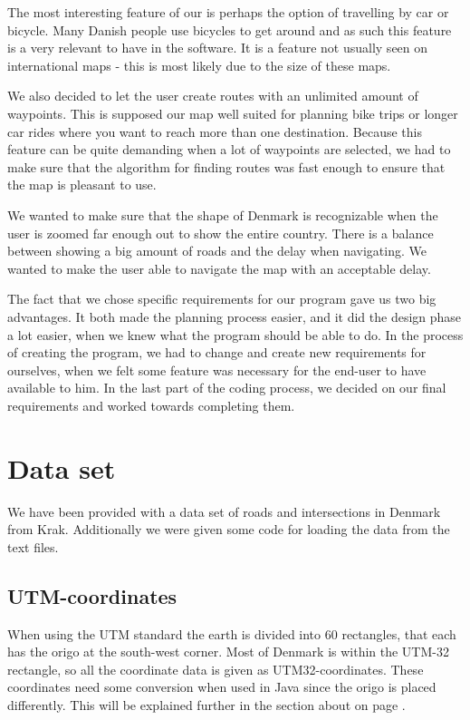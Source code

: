 The most interesting feature of our  is perhaps the
option of travelling by car or bicycle. Many Danish
people use bicycles to get around and as such this feature is a very relevant
to have in the software. It is a feature not usually seen on
international maps - this is most likely due to the size of these maps.

We also decided to let the user create routes with an unlimited amount of
waypoints. This is supposed our map well suited for planning bike trips or
longer car rides where you want to reach more than one destination. Because this
feature can be quite demanding when a lot of waypoints are selected, we had to
make sure that the algorithm for finding routes was fast enough to ensure that the 
map is pleasant to use.

We wanted to make sure that the shape of Denmark is recognizable when
the user is zoomed far enough out to show the entire country. There is a balance between
showing a big amount of roads and the delay when navigating. We wanted to make
the user able to navigate the map with an acceptable delay. 

The fact that we chose specific requirements for our program gave us two big
advantages. It both made the planning process easier, and it did the design phase a lot 
easier, when we knew what the program should be able to do. In the process of creating the
program, we had to change and create new requirements for ourselves, when we
felt some feature was necessary for the end-user to have available to him. In
the last part of the coding process, we decided on our final requirements and worked towards completing them. 

\section{Data set}
\label{BG-DS}
We have been provided with a data set of roads and intersections in Denmark 
from Krak. Additionally we were given some code for loading the data from the 
text files.

\subsection{UTM-coordinates}
\label{BG-DS-UTM}
When using the UTM standard the earth is divided into 60 rectangles, that each 
has the origo at the south-west corner. Most of Denmark is within the UTM-32 
rectangle, so all the coordinate data is given as UTM32-coordinates.
These coordinates need some conversion when used in Java since the origo is placed 
differently. This will be explained further in the section about 
on page \pageref{UTM-conversion}.

